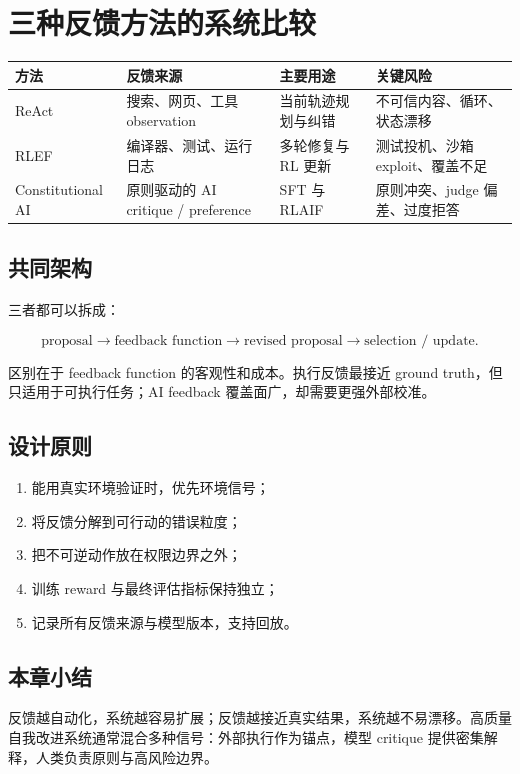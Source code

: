 \section{三种反馈方法的系统比较}

\begin{table}[H]
\centering
\small
\begin{tabular}{>{\raggedright\arraybackslash}p{2.3cm}>{\raggedright\arraybackslash}p{3.4cm}>{\raggedright\arraybackslash}p{3.2cm}>{\raggedright\arraybackslash}p{4.2cm}}
\toprule
\textbf{方法} & \textbf{反馈来源} & \textbf{主要用途} & \textbf{关键风险} \\
\midrule
ReAct & 搜索、网页、工具 observation & 当前轨迹规划与纠错 & 不可信内容、循环、状态漂移 \\
RLEF & 编译器、测试、运行日志 & 多轮修复与 RL 更新 & 测试投机、沙箱 exploit、覆盖不足 \\
Constitutional AI & 原则驱动的 AI critique / preference & SFT 与 RLAIF & 原则冲突、judge 偏差、过度拒答 \\
\bottomrule
\end{tabular}
\end{table}

\subsection{共同架构}

三者都可以拆成：

$$
\text{proposal}\rightarrow\text{feedback function}
\rightarrow\text{revised proposal}\rightarrow\text{selection / update}.
$$

区别在于 feedback function 的客观性和成本。执行反馈最接近 ground truth，但只适用于可执行任务；AI feedback 覆盖面广，却需要更强外部校准。

\subsection{设计原则}

\begin{enumerate}
    \item 能用真实环境验证时，优先环境信号；
    \item 将反馈分解到可行动的错误粒度；
    \item 把不可逆动作放在权限边界之外；
    \item 训练 reward 与最终评估指标保持独立；
    \item 记录所有反馈来源与模型版本，支持回放。
\end{enumerate}

\subsection{本章小结}

反馈越自动化，系统越容易扩展；反馈越接近真实结果，系统越不易漂移。高质量自我改进系统通常混合多种信号：外部执行作为锚点，模型 critique 提供密集解释，人类负责原则与高风险边界。

